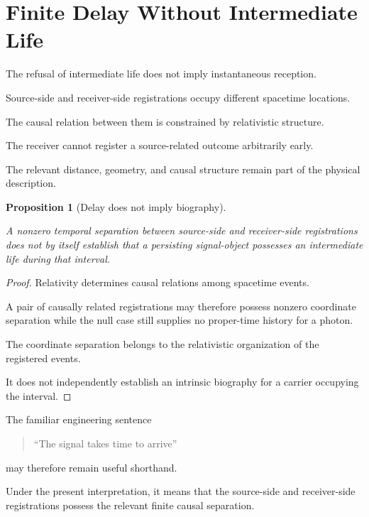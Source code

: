 \documentclass[12pt,onecolumn]{article}
\newtheorem{proposition}{Proposition}[section]
\begin{document}
\section{Finite Delay Without Intermediate Life}

The refusal of intermediate life does not imply instantaneous reception.

Source-side and receiver-side registrations occupy different spacetime
locations.

The causal relation between them is constrained by relativistic
structure.

The receiver cannot register a source-related outcome arbitrarily early.

The relevant distance, geometry, and causal structure remain part of the
physical description.

\begin{proposition}[Delay does not imply biography]
\label{prop:delay}

A nonzero temporal separation between source-side and receiver-side
registrations does not by itself establish that a persisting
signal-object possesses an intermediate life during that interval.

\end{proposition}

\begin{proof}

Relativity determines causal relations among spacetime events.

A pair of causally related registrations may therefore possess nonzero
coordinate separation while the null case still supplies no proper-time
history for a photon.

The coordinate separation belongs to the relativistic organization of
the registered events.

It does not independently establish an intrinsic biography for a
carrier occupying the interval.

\end{proof}

The familiar engineering sentence

\begin{quote}
``The signal takes time to arrive''
\end{quote}

may therefore remain useful shorthand.

Under the present interpretation, it means that the source-side and
receiver-side registrations possess the relevant finite causal
separation.
\end{document}
